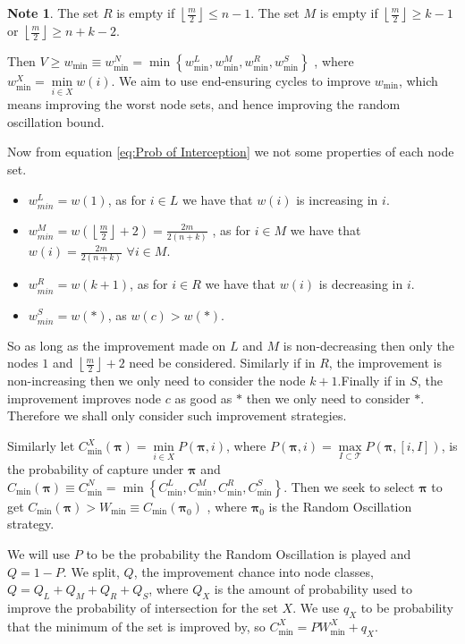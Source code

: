 \documentclass[a4paper,10pt]{article}
\newcommand{\floor}[1]{\left \lfloor #1 \right \rfloor}
\theoremstyle{definition}
\theoremstyle{definition}
\theoremstyle{remark}
\theoremstyle{definition}
\newtheorem*{note}{Note}
\begin{document}
\begin{note}
The set $R$ is empty if $\floor{\frac{m}{2}} \leq n-1$. The set $M$ is empty if $\floor{\frac{m}{2}} \geq k-1$ or $\floor{\frac{m}{2}} \geq n+k-2$.
\end{note}

Then $ V \geq w_{\min} \equiv w_{\min}^{N}=\min \left\{ w_{\min}^{L},w_{\min}^{M},w_{\min}^{R},w_{\min}^{S} \right\}$ , where $w_{\min}^{X}=\min\limits_{i \in X} w(i)$. We aim to use end-ensuring cycles to improve $w_{\min}$, which means improving the worst node sets, and hence improving the random oscillation bound.


Now from equation \ref{eq:Prob of Interception} we not some properties of each node set.
\begin{itemize}
\item $w_{min}^{L}=w(1)$, as for $i \in L$ we have that $w(i)$ is increasing in $i$.
\item $w_{min}^{M}=w(\floor{\frac{m}{2}}+2)=\frac{2m}{2(n+k)}$ , as for $i \in M $ we have that $w(i)=\frac{2m}{2(n+k)}$ $\forall i \in M$.
\item $w_{min}^{R}=w(k+1)$, as for $i \in R$ we have that $w(i)$ is decreasing in $i$.
\item $w_{min}^{S}=w(*)$, as $w(c) > w(*)$.
\end{itemize}

So as long as the improvement made on $L$ and $M$ is non-decreasing then only the nodes $1$ and $\floor{\frac{m}{2}}+2$ need be considered. Similarly if in $R$, the improvement is non-increasing then we only need to consider the node $k+1$.Finally if in $S$, the improvement improves node $c$ as good as $*$ then we only need to consider $*$. Therefore we shall only consider such improvement strategies.

Similarly let $C_{\min}^{X} (\bm{\pi}) = \min\limits_{i \in X} P(\bm{\pi},i)$, where $P(\bm{\pi},i)=\max\limits_{ I \subset \mathcal{T}} P(\bm{\pi},[i,I])$, is the probability of capture under $\bm{\pi}$ and $C_{\min} (\bm{\pi}) \equiv C_{\min}^{N} = \min \left\{ C_{\min}^{L},  C_{\min}^{M},  C_{\min}^{R},  C_{\min}^{S} \right\}$. Then we seek to select $\bm{\pi}$ to get $C_{\min} (\bm{\pi}) > W_{\min} \equiv C_{\min}(\bm{\pi}_{0})$ , where $\bm{\pi}_{0}$ is the Random Oscillation strategy.

We will use $P$ to be the probability the Random Oscillation is played and $Q=1-P$. We split, $Q$, the improvement chance into node classes, $Q=Q_{L}+Q_{M}+Q_{R}+Q_{S}$, where $Q_{X}$ is the amount of probability used to improve the probability of intersection for the set $X$. We use $q_{X}$ to be probability that the minimum of the set is improved by, so $C_{\min}^{X}=PW_{\min}^{X}+q_{X}$.
\end{document}

